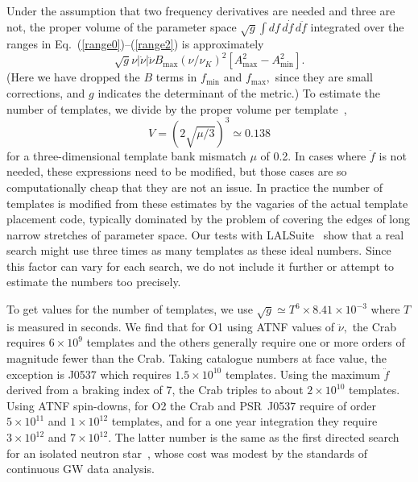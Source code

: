 \documentclass{ttuthes2007}
\begin{document}
Under the assumption that two frequency derivatives are needed and three are
not, the proper volume of the parameter space $\sqrt{g} \int df\, d\dot f\,
d\ddot f$ integrated over the ranges in Eq.~(\ref{range0})--(\ref{range2}) is
approximately
\begin{equation}
\label{propvol}
\sqrt{g} \nu \left| \dot\nu \right| \ddot\nu B_{\max} \left( \nu/\nu_K
\right)^2 \left[ A_{\max}^2 - A_{\min}^2 \right].
\end{equation}
(Here we have dropped the $B$ terms in $f_{\min}$ and $f_{\max},$ since they
are small corrections, and $g$ indicates the determinant of the metric.)
To estimate the number of templates, we divide by the proper volume per
template~\cite{Owen_1996},
\begin{equation}
V = \left( 2 \sqrt{\mu/3} \right)^3 \simeq 0.138
\end{equation}
for a three-dimensional template bank mismatch $\mu$ of 0.2.
In cases where $\ddot f$ is not needed, these expressions need to be modified,
but those cases are so computationally cheap that they are not an issue.
In practice the number of templates is modified from these estimates by the
vagaries of the actual template placement code, typically dominated by the
problem of covering the edges of long narrow stretches of parameter space.
Our tests with LALSuite~\cite{LALSuite} show that a real search might use
three times as many templates as these ideal numbers.
Since this factor can vary for each search, we do not include it further or
attempt to estimate the numbers too precisely.

To get values for the number of templates, we use $\sqrt{g} \simeq T^6 \times
8.41\times10^{-3}$ where $T$ is measured in seconds.
We find that for \ac{O1} using ATNF values of $\ddot\nu,$ the Crab requires
$6\times10^9$ templates and the others generally require one or more orders of
magnitude fewer than the Crab.
Taking catalogue numbers at face value, the exception is J0537
which requires $1.5\times10^{10}$ templates.
Using the maximum $\ddot f$ derived from a braking index of 7, the Crab
triples to about $2\times10^{10}$ templates.
Using ATNF spin-downs, for \ac{O2} the Crab and PSR~J0537
require of order $5\times10^{11}$ and $1\times10^{12}$ templates, and for a
one year integration they require $3\times10^{12}$ and $7\times10^{12}.$
The latter number is the same as the first directed search for an isolated
neutron star~\cite{Abadie:2010hv}, whose cost was modest by the standards of
continuous \ac{GW} data analysis.
\end{document}
